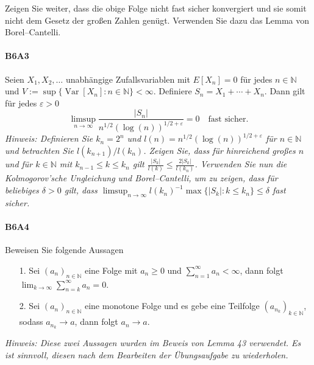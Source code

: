 \documentclass{article}
\begin{document}
Zeigen Sie weiter, dass die obige Folge nicht fast sicher konvergiert und sie somit nicht dem Gesetz der großen Zahlen genügt.
Verwenden Sie dazu das Lemma von Borel--Cantelli.
\newpage

\paragraph{B6A3}
Seien $X_1,X_2,\dots$ unabhängige Zufallsvariablen mit $E[X_n]=0$ für jedes $n\in\mathbb{N}$ und $V:=\sup\{\operatorname{Var}[X_n]:n\in\mathbb{N}\}<\infty$.
Definiere $S_n=X_1+\cdots+X_n$.
Dann gilt für jedes $\varepsilon>0$
\[
  \limsup_{n\to\infty}\frac{|S_n|}{n^{1/2}(\log(n))^{1/2+\varepsilon}}=0\quad\text{fast sicher.}
\]
\emph{Hinweis: Definieren Sie $k_n=2^n$ und $l(n)=n^{1/2}(\log(n))^{1/2+\varepsilon}$ für $n\in\mathbb{N}$ und betrachten Sie $l(k_{n+1})/l(k_n)$.
  Zeigen Sie, dass für hinreichend großes $n$ und für $k\in\mathbb{N}$ mit $k_{n-1}\leq k\leq k_n$ gilt $\frac{|S_k|}{l(k)}\leq\frac{2|S_k|}{l({k_n})}$.
Verwenden Sie nun die Kolmogorov'sche Ungleichung und Borel--Cantelli, um zu zeigen, dass für beliebiges $\delta>0$ gilt, dass $\limsup_{n\to\infty}l(k_n)^{-1}\max\{|S_k|: k\leq k_n\}\leq\delta$ fast sicher.}
\newpage

\paragraph{B6A4}
Beweisen Sie folgende Aussagen
\begin{enumerate}
\item[1.] Sei $(a_n)_{n\in\mathbb{N}}$ eine Folge mit $a_n\geq0$ und $\sum_{n=1}^\infty a_n<\infty$, dann folgt $\lim_{k\to\infty}\sum_{n=k}^\infty a_n=0$.
\item[2.] Sei $(a_n)_{n\in\mathbb{N}}$ eine monotone Folge und es gebe eine Teilfolge $(a_{n_k})_{k\in\mathbb{N}}$, sodass $a_{n_k}\to a$, dann folgt $a_n\to a$.
\end{enumerate}
\emph{Hinweis: Diese zwei Aussagen wurden im Beweis von Lemma 43 verwendet.
Es ist sinnvoll, diesen nach dem Bearbeiten der Übungsaufgabe zu wiederholen.}
\newpage



\end{document}

